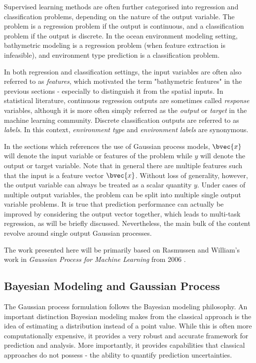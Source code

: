 		Supervised learning methods are often further categorised into regression and classification problems, depending on the nature of the output variable. The problem is a regression problem if the output is continuous, and a classification problem if the output is discrete. In the ocean environment modeling setting, bathymetric modeling is a regression problem (when feature extraction is infeasible), and environment type prediction is a classification problem.
		
		In both regression and classification settings, the input variables are often also referred to as \textit{features}, which motivated the term "bathymetric features" in the previous sections - especially to distinguish it from the spatial inputs. In statistical literature, continuous regression outputs are sometimes called \textit{response} variables, although it is more often simply referred as the \textit{output} or \textit{target} in the machine learning community. Discrete classification outputs are referred to as \textit{labels}. In this context, \textit{environment type} and \textit{environment labels} are synonymous. 
		
		In the sections which references the use of Gaussian process models, $\bvec{x}$ will denote the input variable or features of the problem while $y$ will denote the output or target variable. Note that in general there are multiple features such that the input is a feature vector $\bvec{x}$. Without loss of generality, however, the output variable can always be treated as a scalar quantity $y$. Under cases of multiple output variables, the problem can be split into multiple single output variable problems. It is true that prediction performance can actually be improved by considering the output vector together, which leads to multi-task regression, as will be briefly discussed. Nevertheless, the main bulk of the content revolve around single output Gaussian processes.
		
		The work presented here will be primarily based on Rasmussen and William's work in \textit{Gaussian Process for Machine Learning} from 2006 \cite{GaussianProcessForMachineLearning}. 
	
		\subsection{Bayesian Modeling and Gaussian Process}
		\label{Background:GaussianProcesses:BayesianModeling}
		
			The Gaussian process formulation follows the Bayesian modeling philosophy. An important distinction Bayesian modeling makes from the classical approach is the idea of estimating a distribution instead of a point value. While this is often more computationally expensive, it provides a very robust and accurate framework for prediction and analysis. More importantly, it provides capabilities that classical approaches do not possess - the ability to quantify prediction uncertainties. 
			
